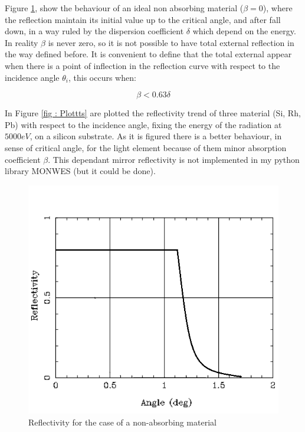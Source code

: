 \begin{flushleft}
Figure \ref{fig: IdealReflection}, show the behaviour of an ideal non absorbing material ($\beta = 0 $), where the reflection maintain its initial value up to the critical angle, and after fall down, in a way ruled by the dispersion coefficient $\delta $ which depend on the energy. In reality $\beta $ is never zero, so it is not possible to have total external reflection in the way defined before. It is convenient to define that the total external appear when there is  a point of inflection in the reflection curve with respect to the incidence angle $\theta_i $, this occurs when:
\end{flushleft}
\begin{equation}
\beta < 0.63 \delta
\label{eq: last}
\end{equation}
\begin{flushleft}
In Figure \ref{fig : Plottts} are plotted the reflectivity trend of three material (Si, Rh, Pb) with respect to the incidence angle, fixing the energy of the radiation at $5000 eV$, on a silicon substrate. As it is figured there is a  better behaviour, in sense of critical angle, for the light element because of them minor absorption coefficient $\beta $. This dependant mirror reflectivity is not implemented in my python library MONWES (but it could be done). 
\end{flushleft}
\begin{figure}[]
%
\centering
%
\includegraphics[width=.6\textwidth]{Immagini/Chapter1/IdealReflection}
%
\caption{Reflectivity for the case of a non-absorbing material}
%
\label{fig: IdealReflection}
%
\end{figure}
